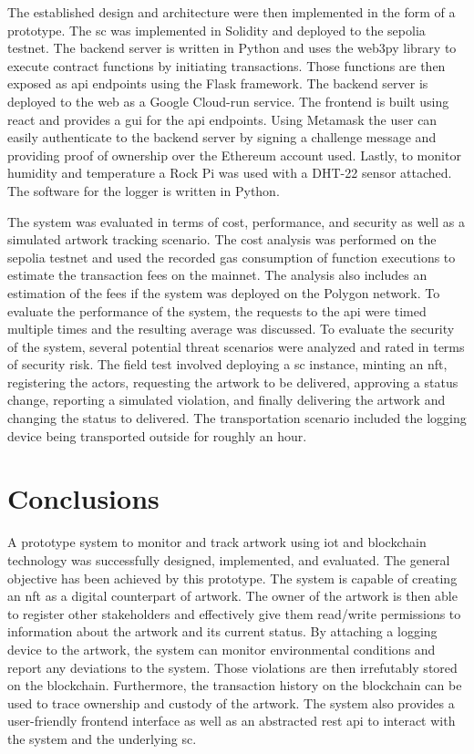 The established design and architecture were then implemented in the form of a prototype. The \gls{sc} was implemented in Solidity and deployed to the sepolia testnet. The backend server is written in Python and uses the web3py library to execute contract functions by initiating transactions. Those functions are then exposed as \gls{api} endpoints using the Flask framework. The backend server is deployed to the web as a Google Cloud-run service. The frontend is built using react and provides a \gls{gui} for the \gls{api} endpoints. Using Metamask the user can easily authenticate to the backend server by signing a challenge message and providing proof of ownership over the Ethereum account used. Lastly, to monitor humidity and temperature a Rock Pi was used with a DHT-22 sensor attached. The software for the logger is written in Python. 

The system was evaluated in terms of cost, performance, and security as well as a simulated artwork tracking scenario. The cost analysis was performed on the sepolia testnet and used the recorded gas consumption of function executions to estimate the transaction fees on the mainnet. The analysis also includes an estimation of the fees if the system was deployed on the Polygon network. To evaluate the performance of the system, the requests to the \gls{api} were timed multiple times and the resulting average was discussed. To evaluate the security of the system, several potential threat scenarios were analyzed and rated in terms of security risk.  The field test involved deploying a \gls{sc} instance, minting an \gls{nft}, registering the actors, requesting the artwork to be delivered, approving a status change, reporting a simulated violation, and finally delivering the artwork and changing the status to delivered. The transportation scenario included the logging device being transported outside for roughly an hour. 

\section{Conclusions}
A prototype system to monitor and track artwork using \gls{iot} and blockchain technology was successfully designed, implemented, and evaluated. The general objective has been achieved by this prototype. The system is capable of creating an \gls{nft} as a digital counterpart of artwork. The owner of the artwork is then able to register other stakeholders and effectively give them read/write permissions to information about the artwork and its current status. By attaching a logging device to the artwork, the system can monitor environmental conditions and report any deviations to the system. Those violations are then irrefutably stored on the blockchain. Furthermore, the transaction history on the blockchain can be used to trace ownership and custody of the artwork. The system also provides a user-friendly frontend interface as well as an abstracted \gls{rest} \gls{api} to interact with the system and the underlying \gls{sc}.

